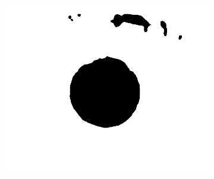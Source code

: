 \documentclass{article}
\begin{document}
\begin{figure}[H]
\begin{subfigure}{.09\textwidth}
  \label{fig:arrow}
\end{subfigure}%
\begin{subfigure}{.35\textwidth}
  \centering
  \includegraphics[width=0.97\linewidth]{_Figures/raw_data_3_cond_dilation.png}
  \caption{}
  \label{fig:raw_3_closure}
\end{subfigure}



\end{figure}
\end{document}
